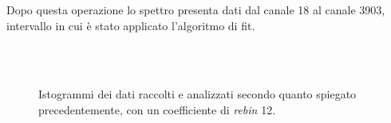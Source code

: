 \documentclass[10pt, oneside, a4paper]{article}   	%
\begin{document}
Dopo questa operazione lo spettro presenta dati dal canale 18 al canale 3903, intervallo in cui è stato applicato l'algoritmo di fit. 
%
\begin{figure}[h!]
\centering
{} \\
 \\
\caption{Istogrammi dei dati raccolti e analizzati secondo quanto spiegato precedentemente, con un coefficiente di \emph{rebin} 12.}
\label{fig::histo}
\end{figure}
%
\end{document}
